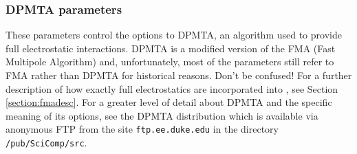 \subsubsection{DPMTA parameters}

These parameters control the options to DPMTA, an algorithm
used to provide full electrostatic interactions.  DPMTA is a
modified version of the FMA (Fast Multipole Algorithm) and, 
unfortunately, most of the parameters still refer to FMA
rather than DPMTA for historical reasons.  Don't be confused!
\prettypar
For a further description of how exactly full electrostatics
are incorporated into \NAMD, see Section \ref{section:fmadesc}.
For a greater level of detail about DPMTA and the specific
meaning of its options, see the DPMTA distribution which is
available via anonymous FTP from the site \verb!ftp.ee.duke.edu!
in the directory \verb!/pub/SciComp/src!.

